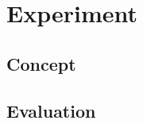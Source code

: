 \chapter{Experiment}
\label{chapter:body}
\thispagestyle{myheadings}

\graphicspath{{3_Body/Figures/}}

\section{Concept}
\label{sec:history}

\clearpage

\section{Evaluation}
\label{sec:history}

\clearpage



